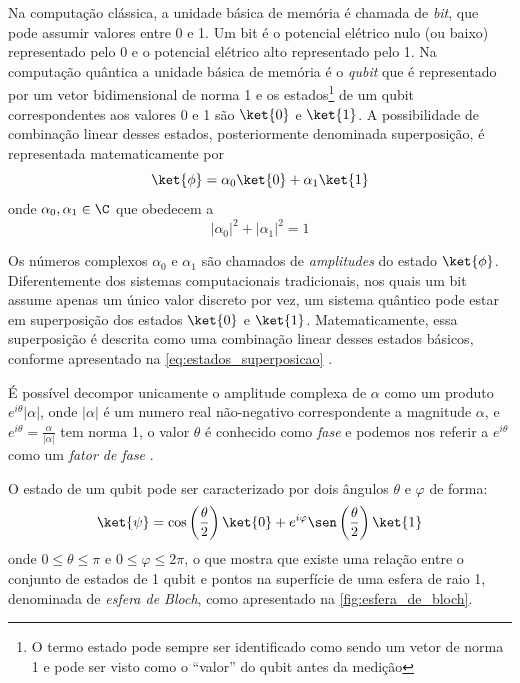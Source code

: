 Na computação clássica, a unidade básica de memória é chamada de \textit{bit}, que pode assumir valores entre 0 e 1. Um bit é o potencial elétrico nulo (ou baixo) representado pelo 0 e o potencial elétrico alto representado pelo 1. Na computação quântica a unidade básica de memória é o \textit{qubit} que é representado por um vetor bidimensional de norma 1 e os estados\footnote{O termo estado pode sempre ser identificado como sendo um vetor de norma 1 e pode ser visto como o ``valor'' do qubit antes da medição} de um qubit correspondentes aos valores 0 e 1 são $\ket{0}$ e $\ket{1}$. A possibilidade de combinação linear desses estados, posteriormente denominada superposição, é representada matematicamente por
    \begin{equation}
        \label{eq:estados_superposicao}
        \ket{\phi}=\alpha_0\ket{0}+\alpha_1\ket{1}
    \end{equation}
    onde $\alpha_0, \alpha_1\in\C$ que obedecem a
    $$
        |\alpha_0|^2+|\alpha_1|^2=1
    $$
    
Os números complexos $\alpha_0$ e $\alpha_1$ são chamados de \textit{amplitudes} do estado $\ket{\phi}$. Diferentemente dos sistemas computacionais tradicionais, nos quais um bit assume apenas um único valor discreto por vez, um sistema quântico pode estar em superposição dos estados $\ket{0}$ e $\ket{1}$. Matematicamente, essa superposição é descrita como uma combinação linear desses estados básicos, conforme apresentado na \autoref{eq:estados_superposicao} \cite[pág. 13]{nielsen_quantum_2002}.
    
É possível decompor unicamente o amplitude complexa de $\alpha$ como um produto $e^{i\theta}|\alpha|$, onde $|\alpha|$ é um numero real não-negativo correspondente a magnitude $\alpha$, e $e^{i\theta}=\frac{\alpha}{|\alpha|}$ tem norma 1, o valor $\theta$ é conhecido como \textit{fase} e podemos nos referir a $e^{i\theta}$ como um \textit{fator de fase} \cite{Rieffel2000}.

O estado de um qubit pode ser caracterizado por dois ângulos $\theta$ e $\varphi$ de forma:
$$
    \label{eq:ket_psi}
    \ket{\psi}=\cos\left(\dfrac{\theta}{2}\right)\ket{0}+e^{i\varphi}\sen\left(\dfrac{\theta}{2}\right)\ket{1}
$$
onde $0\leq\theta\leq\pi$ e $0\leq\varphi\leq2\pi$, o que mostra que existe uma relação entre o conjunto de estados de 1 qubit e pontos na superfície de uma esfera de raio 1, denominada de \textit{esfera de Bloch}, como apresentado na \autoref{fig:esfera_de_bloch}.
    

